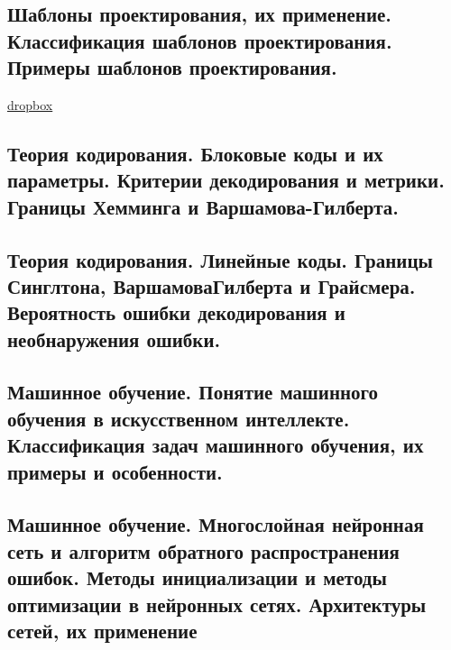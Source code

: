 \documentclass{article}
\begin{document}
\subsection{Шаблоны проектирования, их применение. Классификация шаблонов проектирования. Примеры шаблонов проектирования.}

\href{https://www.dropbox.com/sh/4st5b16mvdf8gkj/AACWB4gDVx73cjp5xudo1nGma/Programming/18%20%D0%A8%D0%B0%D0%B1%D0%BB%D0%BE%D0%BD%D1%8B%20%D0%BF%D1%80%D0%BE%D0%B5%D0%BA%D1%82%D0%B8%D1%80%D0%BE%D0%B2%D0%B0%D0%BD%D0%B8%D1%8F.pdf?dl=0}{dropbox}

\subsection{Теория кодирования. Блоковые коды и их параметры. Критерии декодирования и метрики. Границы Хемминга и Варшамова-Гилберта.}

\subsection{Теория кодирования. Линейные коды. Границы Синглтона, ВаршамоваГилберта и Грайсмера. Вероятность ошибки декодирования и необнаружения ошибки.}

\subsection{Машинное обучение. Понятие машинного обучения в искусственном интеллекте. Классификация задач машинного обучения, их примеры и особенности.}

\subsection{Машинное обучение. Многослойная нейронная сеть и алгоритм обратного распространения ошибок. Методы инициализации и методы оптимизации в нейронных сетях. Архитектуры сетей, их применение}
\end{document}
